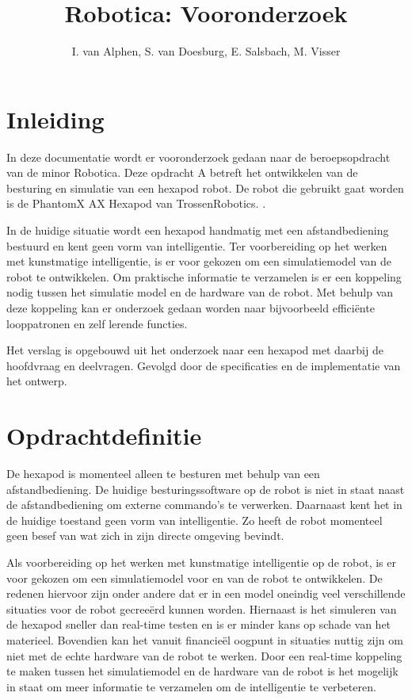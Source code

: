 \documentclass[10pt,a4paper]{article}
\title{Robotica: Vooronderzoek}
\author{I. van Alphen, S. van Doesburg, E.  Salsbach, M. Visser}
\begin{document}
\maketitle
\newpage

\tableofcontents
\newpage

\iffalse %
\section{Samenvatting}
Not in use yet
\newpage
\fi

\section{Inleiding}
In deze documentatie wordt er vooronderzoek gedaan naar de beroepsopdracht van de minor Robotica. Deze opdracht A betreft het ontwikkelen van de besturing en simulatie van een hexapod robot.\cite{beroepsopdrachten} De robot die gebruikt gaat worden is de PhantomX AX Hexapod van TrossenRobotics. \cite{PhantomX AX Hexapod Kit}.

In de huidige situatie wordt een hexapod handmatig met een afstandbediening bestuurd en kent geen vorm van intelligentie. Ter voorbereiding op het werken met kunstmatige intelligentie, is er voor gekozen om een simulatiemodel van de robot te ontwikkelen. Om praktische informatie te verzamelen is er een koppeling nodig tussen het simulatie model en de hardware van de robot. Met behulp van deze koppeling kan er onderzoek gedaan worden naar bijvoorbeeld effici\"ente looppatronen en zelf lerende functies.

Het verslag is opgebouwd uit het onderzoek naar een hexapod met daarbij de hoofdvraag en deelvragen. Gevolgd door de specificaties en de implementatie van het ontwerp.

\newpage

\section{Opdrachtdefinitie}
De hexapod is momenteel alleen te besturen met behulp van een afstandbediening. De huidige besturingssoftware op de robot is niet in staat naast de afstandbediening om externe commando's te verwerken. Daarnaast kent het in de huidige toestand geen vorm van intelligentie. Zo heeft de robot momenteel geen besef van wat zich in zijn directe omgeving bevindt.

Als voorbereiding op het werken met kunstmatige intelligentie op de robot, is er voor gekozen om een simulatiemodel voor en van de robot te ontwikkelen. De redenen hiervoor zijn onder andere dat er in een model oneindig veel verschillende situaties voor de robot gecree\"erd kunnen worden. Hiernaast is het simuleren van de hexapod sneller dan real-time testen en is er minder kans op schade van het materieel. Bovendien kan het vanuit financie\"el oogpunt in situaties nuttig zijn om niet met de echte hardware van de robot te werken. 
Door een real-time koppeling te maken tussen het simulatiemodel en de hardware van de robot is het mogelijk in staat om meer informatie te verzamelen om de intelligentie te verbeteren.
\end{document}
